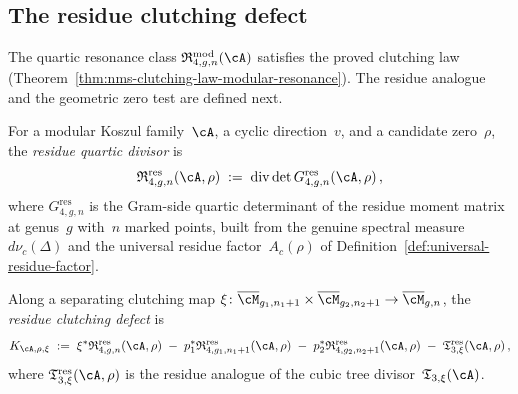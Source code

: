 \subsection{The residue clutching defect}%
\label{sec:residue-clutching-defect}%
%

The quartic resonance class $\mathfrak{R}_{4,g,n}^{\mathrm{mod}}(\cA)$
satisfies the proved clutching law
(Theorem~\ref{thm:nms-clutching-law-modular-resonance}).
The residue analogue and the geometric
zero test are defined next.

\begin{definition}%
\label{def:residue-divisor}%
%
For a modular Koszul family~$\cA$, a cyclic direction~$v$,
and a candidate zero~$\rho$, the \emph{residue quartic divisor}
is
\begin{equation}\label{eq:residue-divisor}
\mathfrak{R}_{4,g,n}^{\mathrm{res}}(\cA,\rho)
\;:=\;
\operatorname{div}\det G_{4,g,n}^{\mathrm{res}}(\cA,\rho)\,,
\end{equation}
where $G_{4,g,n}^{\mathrm{res}}$ is the Gram-side quartic
determinant of the residue moment matrix at genus~$g$
with~$n$ marked points, built from the genuine spectral
measure~$d\nu_c(\Delta)$ and the universal residue
factor~$A_c(\rho)$ of
Definition~\textup{\ref{def:universal-residue-factor}}.
\end{definition}

\begin{definition}%
\label{def:residue-clutching-defect}%
%
Along a separating clutching map $\xi\colon
\overline{\cM}_{g_1,n_1+1} \times
\overline{\cM}_{g_2,n_2+1} \to \overline{\cM}_{g,n}$,
the \emph{residue clutching defect} is
\begin{equation}\label{eq:residue-clutching-defect}
K_{\cA,\rho,\xi}
\;:=\;
\xi^*\mathfrak{R}_{4,g,n}^{\mathrm{res}}(\cA,\rho)
\;-\;
p_1^*\mathfrak{R}_{4,g_1,n_1+1}^{\mathrm{res}}(\cA,\rho)
\;-\;
p_2^*\mathfrak{R}_{4,g_2,n_2+1}^{\mathrm{res}}(\cA,\rho)
\;-\;
\mathfrak{T}_{3,\xi}^{\mathrm{res}}(\cA,\rho)\,,
\end{equation}
where $\mathfrak{T}_{3,\xi}^{\mathrm{res}}(\cA,\rho)$
is the residue analogue of the cubic tree
divisor~$\mathfrak{T}_{3,\xi}(\cA)$.
\end{definition}

